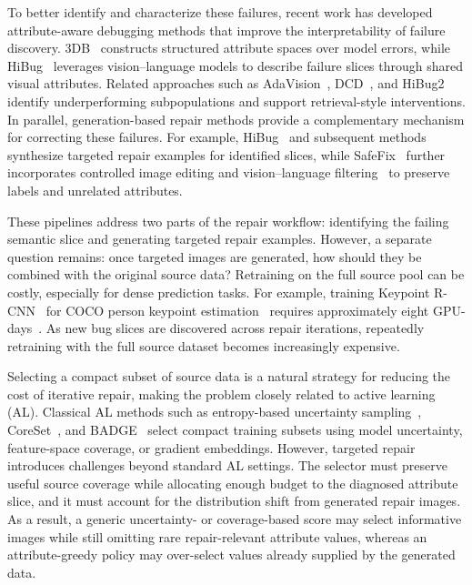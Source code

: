 \documentclass{article}
\newcommand{\safefix}{SafeFix\xspace}
\newcommand{\hibug}{HiBug\xspace}
\begin{document}
To better identify and characterize these failures, recent work has developed attribute-aware debugging methods that improve the interpretability of failure discovery. 3DB~\citep{leclerc20213db} constructs structured attribute spaces over model errors, while \hibug~\citep{chen2023hibug} leverages vision--language models to describe failure slices through shared visual attributes. Related approaches such as AdaVision~\citep{gao2023adaptive}, DCD~\citep{singla2024data}, and HiBug2~\citep{chen2025hibug2} identify underperforming subpopulations and support retrieval-style interventions. In parallel, generation-based repair methods provide a complementary mechanism for correcting these failures. For example, \hibug~\citep{chen2023hibug} and subsequent methods~\citep{zhang2024distributionally,xu2025safefix} synthesize targeted repair examples for identified slices, while \safefix~\citep{xu2025safefix} further incorporates controlled image editing and vision--language filtering~\citep{wang2024finetuned,chen2024visionlanguagemodelstrongfilter} to preserve labels and unrelated attributes.

These pipelines address two parts of the repair workflow: identifying the failing semantic slice and generating targeted repair examples. However, a separate question remains: once targeted images are generated, how should they be combined with the original source data? Retraining on the full source pool can be costly, especially for dense prediction tasks. For example, training Keypoint R-CNN~\citep{mask-rcnn-2017} for COCO person keypoint estimation~\citep{lin2014microsoft} requires approximately eight GPU-days~\citep{detectron2modelzoo}. As new bug slices are discovered across repair iterations, repeatedly retraining with the full source dataset becomes increasingly expensive.

Selecting a compact subset of source data is a natural strategy for reducing the cost of iterative repair, making the problem closely related to active learning (AL). Classical AL methods such as entropy-based uncertainty sampling~\citep{settles2009active}, CoreSet~\citep{sener2018active}, and BADGE~\citep{ash2020deep} select compact training subsets using model uncertainty, feature-space coverage, or gradient embeddings. However, targeted repair introduces challenges beyond standard AL settings. The selector must preserve useful source coverage while allocating enough budget to the diagnosed attribute slice, and it must account for the distribution shift from generated repair images. As a result, a generic uncertainty- or coverage-based score may select informative images while still omitting rare repair-relevant attribute values, whereas an attribute-greedy policy may over-select values already supplied by the generated data.
\end{document}
